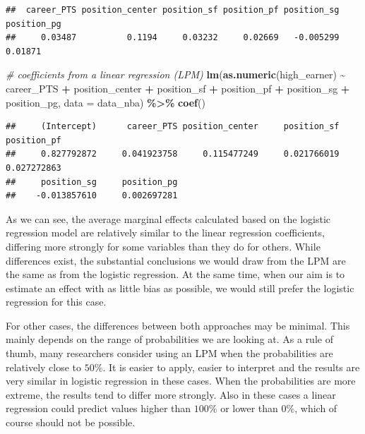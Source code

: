 \documentclass[
]{book}
\newenvironment{Shaded}{\begin{snugshade}}{\end{snugshade}}
\newcommand{\AttributeTok}[1]{\textcolor[rgb]{0.13,0.29,0.53}{#1}}
\newcommand{\CommentTok}[1]{\textcolor[rgb]{0.56,0.35,0.01}{\textit{#1}}}
\newcommand{\FunctionTok}[1]{\textcolor[rgb]{0.13,0.29,0.53}{\textbf{#1}}}
\newcommand{\NormalTok}[1]{#1}
\newcommand{\SpecialCharTok}[1]{\textcolor[rgb]{0.81,0.36,0.00}{\textbf{#1}}}
\begin{document}
\begin{verbatim}
##  career_PTS position_center position_sf position_pf position_sg position_pg
##     0.03487          0.1194     0.03232     0.02669   -0.005299     0.01871
\end{verbatim}

\begin{Shaded}
\begin{Highlighting}[]
\CommentTok{\# coefficients from a linear regression (LPM)}
\FunctionTok{lm}\NormalTok{(}\FunctionTok{as.numeric}\NormalTok{(high\_earner) }\SpecialCharTok{\textasciitilde{}}\NormalTok{ career\_PTS }\SpecialCharTok{+}\NormalTok{ position\_center }\SpecialCharTok{+}\NormalTok{ position\_sf }\SpecialCharTok{+}\NormalTok{  position\_pf }\SpecialCharTok{+}\NormalTok{ position\_sg }\SpecialCharTok{+}\NormalTok{ position\_pg,}
   \AttributeTok{data =}\NormalTok{ data\_nba) }\SpecialCharTok{\%\textgreater{}\%} 
  \FunctionTok{coef}\NormalTok{()}
\end{Highlighting}
\end{Shaded}

\begin{verbatim}
##     (Intercept)      career_PTS position_center     position_sf     position_pf 
##     0.827792872     0.041923758     0.115477249     0.021766019     0.027272863 
##     position_sg     position_pg 
##    -0.013857610     0.002697281
\end{verbatim}

As we can see, the average marginal effects calculated based on the
logistic regression model are relatively similar to the linear
regression coefficients, differing more strongly for some variables than they
do for others. While differences exist, the substantial conclusions we would
draw from the LPM are the same as from the logistic regression. At the same
time, when our aim is to estimate an effect with as little bias as possible, we
would still prefer the logistic regression for this case.

For other cases, the differences between both approaches may be minimal. This
mainly depends on the range of probabilities we are looking at.
As a rule of thumb, many researchers consider using an LPM when the
probabilities are relatively close to \(50\%\). It is easier to apply,
easier to interpret and the results are very similar in logistic
regression in these cases.
When the probabilities are more extreme, the results tend to differ more
strongly. Also in these cases a linear regression could predict values higher
than \(100\%\) or lower than \(0\%\), which of course should not be possible.
\end{document}
